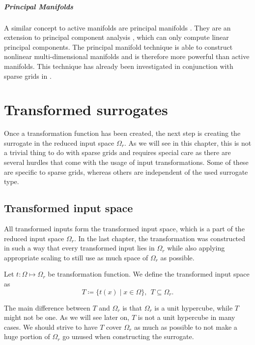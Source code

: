 \documentclass[
  a4paper,  %
  twoside,  %
  bibliography=totoc,
  headsepline,
  cleardoublepage=empty,
  parskip=half,
  draft=false
]{scrbook}
\begin{document}
\paragraph{Principal Manifolds}
A similar concept to active manifolds are principal manifolds \cite{Huo2008}.
They are an extension to principal component analysis \cite{Abdi2010}, which can only compute linear principal components.
The principal manifold technique is able to construct nonlinear multi-dimensional manifolds and is therefore more powerful than active manifolds.
This technique has already been investigated in conjunction with sparse grids in \cite{Feuersaenger2009}.

\chapter{Transformed surrogates}
\label{chap:c4}

Once a transformation function has been created, the next step is creating the surrogate in the reduced input space $\Omega_r$.
As we will see in this chapter, this is not a trivial thing to do with sparse grids and requires special care as there are several hurdles that come with the usage of input transformations.
Some of these are specific to sparse grids, whereas others are independent of the used surrogate type.

\section{Transformed input space}
\label{sec:tis}

All transformed inputs form the transformed input space, which is a part of the reduced input space $\Omega_r$.
In the last chapter, the transformation was constructed in such a way that every transformed input lies in $\Omega_r$ while also applying appropriate scaling to still use as much space of $\Omega_r$ as possible.

\begin{definition}
Let $t \colon \Omega \mapsto \Omega_r$ be transformation function.
We define the transformed input space as
\begin{equation}
T \coloneqq \{t(x) \mid x \in\Omega\}, ~~ T \subseteq \Omega_r.
\end{equation}
\end{definition}
%
The main difference between $T$ and $\Omega_r$ is that $\Omega_r$ is a unit hypercube, while $T$ might not be one.
As we will see later on, $T$ is not a unit hypercube in many cases.
We should strive to have $T$ cover $\Omega_r$ as much as possible to not make a huge portion of $\Omega_r$ go unused when constructing the surrogate.
\end{document}
